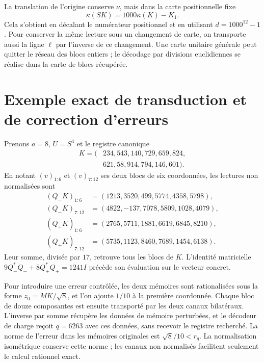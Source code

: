 La translation de l’origine conserve \(\nu\), mais dans la carte
positionnelle fixe
\begin{equation}
 \kappa(SK)=1000\kappa(K)-K_1.
 \label{x_reciprocidad:lib04:cambio-origen}
\end{equation}
Cela s’obtient en décalant le numérateur positionnel et en utilisant
\(d=1000^{12}-1\). Pour conserver la même lecture sous un changement
de carte, on transporte aussi la ligne \(\ell\) par l’inverse
de ce changement. Une carte unitaire générale peut quitter le réseau des
blocs entiers ; le décodage par divisions euclidiennes se réalise
dans la carte de blocs récupérée.

\section{Exemple exact de transduction et de correction d’erreurs}
\label{x_reciprocidad:lib04:ejemplo}

Prenons \(a=8\), \(U=S^4\) et le registre canonique
\begin{equation}
 \begin{split}
 K=(&234,543,140,729,659,824,\\
    &621,58,914,794,146,601).
 \end{split}
 \label{x_reciprocidad:lib04:k-ejemplo}
\end{equation}
En notant \((v)_{1:6}\) et \((v)_{7:12}\) ses deux blocs de
six coordonnées, les lectures non normalisées sont
\begin{align}
 (Q_-K)_{1:6}&=(1213,3520,499,5774,4358,5798),\nonumber\\
 (Q_-K)_{7:12}&=(4822,-137,7078,5809,1028,4079),\nonumber\\
 (Q_+K)_{1:6}&=(2765,5711,1881,6619,6845,8210),\nonumber\\
 (Q_+K)_{7:12}&=(5735,1123,8460,7689,1454,6138).
 \label{x_reciprocidad:lib04:canales-ejemplo}
\end{align}
Leur somme, divisée par \(17\), retrouve tous les blocs de \(K\).
L’identité matricielle
\(9Q_-^*Q_-+8Q_+^*Q_+=1241I\) précède son évaluation sur le
vecteur concret.

Pour introduire une erreur contrôlée, les deux mémoires sont rationalisées sous la forme \(z_0=MK/\sqrt8\), et l'on ajoute \(1/10\) à la première coordonnée. Chaque bloc de douze composantes est ensuite transporté par les deux canaux bilatéraux. L'inverse par somme récupère les données de mémoire perturbées, et le décodeur de charge reçoit \(q=6263\) avec ces données, sans recevoir le registre recherché. La norme de l'erreur dans les mémoires originales est \(\sqrt8/10<r_q\). La normalisation isométrique conserve cette norme ; les canaux non normalisés facilitent seulement le calcul rationnel exact.


